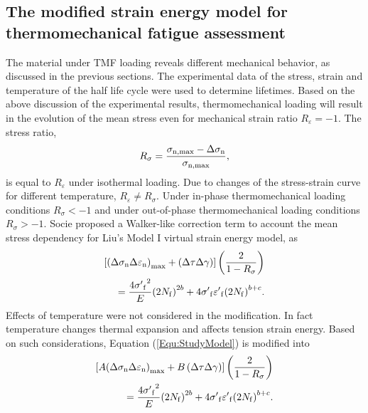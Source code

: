 \documentclass[preprint,5p,twocolumn,11pt,sort&compress]{elsarticle}
\begin{document}
\subsection{The modified strain energy model for thermomechanical fatigue assessment}
The material under TMF loading reveals different mechanical behavior, as discussed in the previous sections. 
The experimental data of the stress, strain and temperature of the half life cycle were used to determine lifetimes.
Based on the above discussion of the experimental results, thermomechanical loading  will result in the evolution of the mean stress even for mechanical strain ratio $R_{\varepsilon}=-1$. The stress ratio,
\begin{equation}
{R_\sigma } = \frac{{{\sigma _{\rm n,\max }} - \Delta {\sigma _{\rm n}}}}{{{\sigma _{\rm n,\max }}}},
\end{equation}
is equal to $R_{\varepsilon}$ under isothermal loading. Due to changes of the stress-strain curve for different temperature, $R_{\varepsilon}\ne R_{\sigma}$. Under in-phase thermomechanical loading conditions ${R_\sigma }<-1$ and under out-of-phase thermomechanical loading conditions ${R_\sigma }>-1$.
Socie \cite{Socie2000} proposed a Walker-like correction term \cite{Walker1970} to account the mean stress dependency for Liu's Model I virtual strain energy model, as
\begin{equation}
\begin{aligned}
\left[ {{{\left( {\Delta {\sigma _{\rm n}}\Delta {\varepsilon _{\rm n}}} \right)}_{\max }} + \left( {\Delta \tau \Delta \gamma } \right)} \right]\left( {\frac{2}{{1 - {R_\sigma }}}} \right)\\
= \frac{{4{{\sigma '}_{\rm f}}^2}}{E}{\left( {2{N_{\rm f}}} \right)^{2b}} + 4{{\sigma '}_{\rm f}}{{\varepsilon '}_{\rm f}}{\left( {2{N_{\rm f}}} \right)^{b + c}}.
\end{aligned}
\label{Equ:StudyModel}
\end{equation}
Effects of temperature were not considered in the modification. In fact temperature changes thermal expansion and affects tension strain energy. 
Based on such considerations, Equation (\ref{Equ:StudyModel}) is modified into
\begin{equation}
\begin{aligned}
\left[ {A{{\left( {\Delta {\sigma _{\rm n}}\Delta {\varepsilon _{\rm n}}} \right)}_{\max }} + B\left( {\Delta \tau \Delta \gamma } \right)} \right]\left( {\frac{2}{{1 - {R_\sigma }}}} \right)\\
= \frac{{4{{\sigma '}_{\rm f}}^2}}{E}{\left( {2{N_{\rm f}}} \right)^{2b}} + 4{{\sigma '}_{\rm f}}{{\varepsilon '}_{\rm f}}{\left( {2{N_{\rm f}}} \right)^{b + c}}.
\end{aligned}
\label{Equ:StudyModel}
\end{equation}
\end{document}

